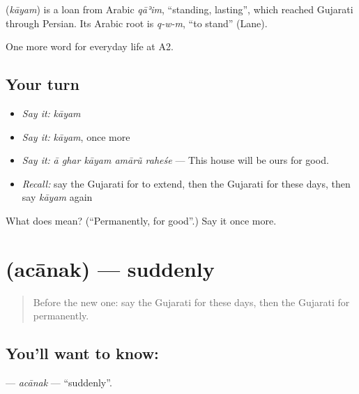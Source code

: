 \begin{cousinweb}
\textbf{} (\emph{kāyam}) is a loan from Arabic \emph{qāʾim}, \textquotedblleft{}standing, lasting\textquotedblright{}, which reached Gujarati through Persian. Its Arabic root is \emph{q-w-m}, \textquotedblleft{}to stand\textquotedblright{} (Lane).
\end{cousinweb}

\begin{grammarlens}[title={What you've built}]
One more word for everyday life at A2.
\end{grammarlens}

\subsection*{Your turn}
\begin{itemize}
\raggedright
  \item \emph{Say it:} \emph{kāyam}
  \item \emph{Say it:} \emph{kāyam}, once more
  \item \emph{Say it:} \emph{ā ghar kāyam amārũ raheśe} — This house will be ours for good.
  \item \emph{Recall:} say the Gujarati for to extend, then the Gujarati for these days, then say \emph{kāyam} again
\end{itemize}

\begin{tcolorbox}[breakable,colback=teal!4,colframe=teal!35!black,title={Before you move on}]
What does  mean? (\textquotedblleft{}Permanently, for good\textquotedblright{}.) Say it once more.
\end{tcolorbox}
\section[\texorpdfstring{\gu{અચાનક} (acānak)}{અચાનક (acānak)}]{ (acānak) — suddenly}

\label{lesson:GU-C182-acanak}



\begin{quote}
Before the new one: say the Gujarati for these days, then the Gujarati for permanently.
\end{quote}

\subsection*{You'll want to know: }
\textbf{} — \emph{acānak} — \textquotedblleft{}suddenly\textquotedblright{}.

